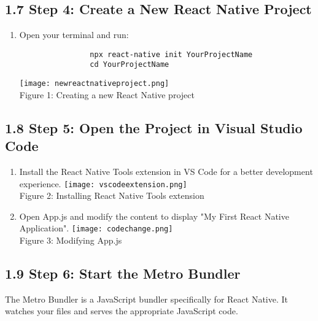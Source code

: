 \documentclass{article}
\begin{document}
        \subsection*{1.7 Step 4: Create a New React Native Project}

        \begin{enumerate}
            \item Open your terminal and run:
                \begin{verbatim}
                npx react-native init YourProjectName
                cd YourProjectName
                \end{verbatim}
               
                        \texttt{[image: newreactnativeproject.png]}\\
                        \caption{Figure 1: Creating a new React Native project}
            
        \end{enumerate}

        \subsection*{1.8 Step 5: Open the Project in Visual Studio Code}

        \begin{enumerate}
          
            \item Install the React Native Tools extension in VS Code for a better development experience.
             \centering
                        \texttt{[image: vscodeextension.png]}\\
                        \caption{Figure 2: Installing React Native Tools extension}
            \item Open App.js and modify the content to display "My First React Native Application".
            \centering
                        \texttt{[image: codechange.png]}\\
                        \caption{Figure 3: Modifying App.js}
        \end{enumerate}

        \subsection*{1.9 Step 6: Start the Metro Bundler}

        The Metro Bundler is a JavaScript bundler specifically for React Native. It watches your files and serves the appropriate JavaScript code.
\end{document}
